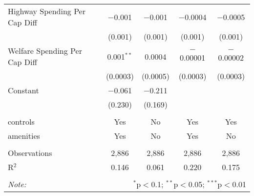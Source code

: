 \begin{table}[!htbp]
\begin{tabular}{@{\extracolsep{5pt}}lcccc}
  Highway Spending Per Cap Diff & $-$0.001 & $-$0.001 & $-$0.0004 & $-$0.0005 \\ 
  & (0.001) & (0.001) & (0.001) & (0.001) \\ 
  Welfare Spending Per Cap Diff & 0.001$^{**}$ & 0.0004 & $-$0.00001 & $-$0.00002 \\ 
  & (0.0003) & (0.0005) & (0.0003) & (0.0003) \\ 
  Constant & $-$0.061 & $-$0.211 &  &  \\ 
  & (0.230) & (0.169) &  &  \\ 
 \hline \\[-1.8ex] 
controls & Yes & No & Yes & Yes \\ 
amenities & Yes & No & Yes & No \\ 
\hline \\[-1.8ex] 
Observations & 2,886 & 2,886 & 2,886 & 2,886 \\ 
R$^{2}$ & 0.146 & 0.061 & 0.220 & 0.175 \\ 
\hline 
\hline \\[-1.8ex] 
\textit{Note:}  & \multicolumn{4}{r}{$^{*}$p$<$0.1; $^{**}$p$<$0.05; $^{***}$p$<$0.01} \\ 
\end{tabular} 
\end{table} 
